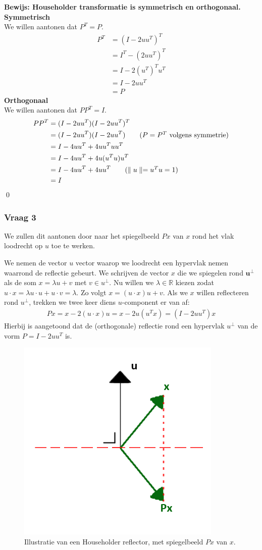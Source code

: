 \documentclass{article}
\begin{document}
\textbf{Bewijs: Householder transformatie is symmetrisch en orthogonaal.}
\textbf{Symmetrisch}\\
We willen aantonen dat $P^T=P$.
\begin{align*}
    P^T &= (I - 2uu^T)^T \\
    &= I^T - (2uu^T)^T\\
    &= I - 2(u^T)^Tu^T\\
    &= I - 2uu^T\\
    &= P
\end{align*}
\textbf{Orthogonaal}\\
We willen aantonen dat $PP^T=I$.
\begin{align*}
    PP^T &= (I - 2uu^T)(I - 2uu^T)^T \\
    &= (I - 2uu^T)(I - 2uu^T) \tag{$P=P^T$ volgens symmetrie}\\
    &= I - 4uu^T + 4uu^Tuu^T\\
    &= I - 4uu^T + 4u(u^Tu)u^T\\
    &= I - 4uu^T + 4uu^T \tag{$\parallel{u}\parallel = u^Tu = 1$}\\
    &= I
\end{align*}
\qed
\subsubsection*{Vraag 3}
We zullen dit aantonen door naar het spiegelbeeld $Px$ van $x$ rond het vlak loodrecht op $u$ toe te werken.

We nemen de vector $u$ vector waarop we loodrecht een hypervlak nemen waarrond de reflectie gebeurt. We schrijven de vector $x$ die we spiegelen rond $\textbf{u}^{\bot}$ als de som $x = \lambda{}u + v$ met $v \in u^{\bot}$. Nu willen we $\lambda \in \mathbb{R}$ kiezen zodat $u \cdot x = \lambda u\cdot u + u\cdot v = \lambda$. Zo volgt $x = (u \cdot x)u + v$.
Als we $x$ willen reflecteren rond $u^{\bot}$, trekken we twee keer diens $u$-component er van af:
\begin{align*}
Px= x-2(u \cdot x)u = x- 2u(u^Tx) = (I-2uu^T)x
\end{align*}
Hierbij is aangetoond dat de (orthogonale) reflectie rond een hypervlak $u^{\bot}$ van de vorm $P = I-2uu^T$ is.

\begin{figure}[H]
\begin{center}
   \includegraphics[width=.4\textwidth]{reflector_schets}
   \caption{Illustratie van een Householder reflector, met spiegelbeeld $Px$ van $x$.}
\end{center}
\end{figure}
\end{document}

